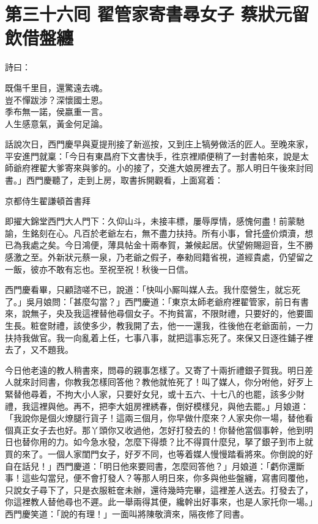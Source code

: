 
\chapter*{第三十六囘 翟管家寄書尋女子 蔡狀元留飲借盤纏}


詩曰：

\begin{myquote} 
既傷千里目，還驚遠去魂。\\豈不憚跋涉？深懷國士恩。\\季布無一諾，侯嬴重一言。\\人生感意氣，黃金何足論。
\end{myquote} 

話說次日，西門慶早與夏提刑接了新巡按，又到庄上犒勞做活的匠人。至晚來家，平安進門就稟：「今日有東昌府下文書快手，徃京裡順便稍了一封書帕來，說是太師爺府裡翟大爹寄來與爹的。小的接了，交進大娘房裡去了。那人明日午後來討囘書。」西門慶聽了，走到上房，取書拆開觀看，上面寫着：

\begin{myquote}[\markfont]
京都侍生翟謙頓首書拜

即擢大錦堂西門大人門下：久仰山斗，未接丰標，屢辱厚情，感愧何盡！前蒙馳諭，生銘刻在心。凡百於老爺左右，無不盡力扶持。所有小事，曾托盛价煩瀆，想已為我處之矣。今日鴻便，薄具帖金十兩奉賀，兼候起居。伏望俯賜迴音，生不勝感激之至。外新狀元蔡一泉，乃老爺之假子，奉勑囘籍省視，道經貴處，仍望留之一飯，彼亦不敢有忘也。至祝至祝！秋後一日信。
\end{myquote} 

西門慶看畢，只顧諮嗟不已，說道：「快叫小厮叫媒人去。我什麼營生，就忘死了。」{}吳月娘問：「甚麼勾當？」西門慶道：「東京太師老爺府裡翟管家，前日有書來，說無子，央及我這裡替他尋個女子。不拘貧富，不限財禮，只要好的，他要圖生長。粧奩財禮，該使多少，教我開了去，他一一還我，徃後他在老爺面前，一力扶持我做官。我一向亂着上任，七事八事，就把這事忘死了。來保又日逐徃鋪子裡去了，又不題我。

今日他老遠的教人稍書來，問尋的親事怎樣了。又寄了十兩折禮銀子賀我。明日差人就來討囘書，你教我怎樣囘答他？教他就恠死了！叫了媒人，你分咐他，好歹上緊替他尋着，不拘大小人家，只要好女兒，或十五六、十七八的也罷，該多少財禮，我這裡與他。再不，把李大姐房裡綉春，倒好模樣兒，與他去罷。」月娘道：「我說你是個火燎腿行貨子！這兩三個月，你早做什麼來？人家央你一場，替他看個真正女子去也好。那丫頭你又收過他，怎好打發去的！你替他當個事幹，他到明日也替你用的力。如今急水發，怎麼下得漿？比不得買什麼兒，拏了銀子到市上就買的來了。一個人家閨門女子，好歹不同，也等着媒人慢慢踏看將來。你倒說的好自在話兒！」西門慶道：「明日他來要囘書，怎麼囘答他？」月娘道：「虧你還斷事！這些勾當兒，便不會打發人？等那人明日來，你多與他些盤纏，寫書囘覆他，只說女子尋下了，只是衣服粧奩未辦，還待幾時完畢，這裡差人送去。打發去了，你這裡教人替他尋也不遲。此一舉兩得其便，纔幹出好事來，也是人家托你一場。」西門慶笑道：「說的有理！」一面叫將陳敬濟來，隔夜修了囘書。

